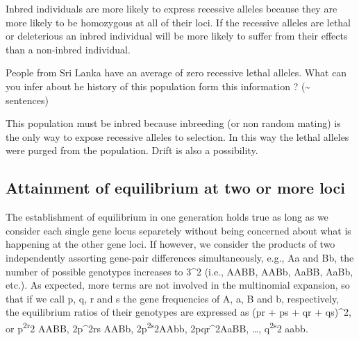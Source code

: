 \documentclass[nofonts,]{tufte-handout}
\begin{document}
Inbred individuals are more likely to express recessive alleles because
they are more likely to be homozygous at all of their loci. If the
recessive alleles are lethal or deleterious an inbred individual will be
more likely to suffer from their effects than a non-inbred individual.

People from Sri Lanka have an average of zero recessive lethal alleles.
What can you infer about he history of this population form this
information ? (\textasciitilde{} sentences)

This population must be inbred because inbreeding (or non random mating)
is the only way to expose recessive alleles to selection. In this way
the lethal alleles were purged from the population. Drift is also a
possibility.

\hypertarget{attainment-of-equilibrium-at-two-or-more-loci}{%
\subsection{Attainment of equilibrium at two or more
loci}\label{attainment-of-equilibrium-at-two-or-more-loci}}

The establishment of equilibrium in one generation holds true as long as
we consider each single gene locus separetely without being concerned
about what is happening at the other gene loci. If however, we consider
the products of two independently assorting gene-pair differences
simultaneously, e.g., Aa and Bb, the number of possible genotypes
increases to 3\^{}2 (i.e., AABB, AABb, AaBB, AaBb, etc.). As expected,
more terms are not involved in the multinomial expansion, so that if we
call p, q, r and s the gene frequencies of A, a, B and b, respectively,
the equilibrium ratios of their genotypes are expressed as (pr + ps + qr
+ qs)\^{}2, or p\textsuperscript{2r}2 AABB, 2p\^{}2rs AABb,
2p\textsuperscript{2s}2AAbb, 2pqr\^{}2AaBB, \ldots,
q\textsuperscript{2s}2 aabb.


\end{document}
